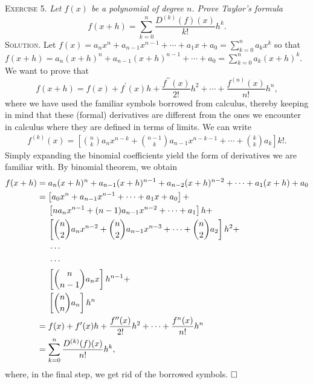 \documentclass[11pt, leqno]{article}
\newcommand{\done}{\ensuremath{\hfill\square}}
\begin{document}
\textsc{Exercise 5}. \emph{Let $f(x)$ be a polynomial of degree $n$. Prove Taylor's formula 
\begin{displaymath}
f(x+h) = \sum_{k=0}^n \frac{D^{(k)}(f)(x)}{k!} h^k.
\end{displaymath}}\textsc{Solution}. Let $f(x) = a_nx^n + a_{n-1}x^{n-1} + \cdots + a_1x + a_0 = \sum_{k=0}^n a_kx^k$ so that $f(x+h) = a_n(x+h)^n + a_{n-1}(x+h)^{n-1} + \cdots + a_0 = \sum_{k=0}^n a_k(x+h)^k$. We want to prove that 
\begin{displaymath}
f(x+h) = f(x) + f^{\prime}(x)h + \frac{f^{\prime\prime}(x)}{2!}h^2 + \cdots + \frac{f^{(n)}(x)}{n!}h^n,
\end{displaymath}
where we have used the familiar symbols borrowed from calculus, thereby keeping in mind that these (formal) derivatives are different from the ones we encounter in calculus where they are defined in terms of limits. We can write 
\begin{align*}
f^{(k)}(x) = \left[\binom{n}{k} a_nx^{n-k} + \binom{n-1}{k}a_{n-1} x^{n-k-1} + \cdots + \binom{k}{k}a_k \right]k!.
\end{align*}
Simply expanding the binomial coefficients yield the form of derivatives we are familiar with. By binomial theorem, we obtain
\begin{align*}
  f(x+h) &= a_n(x+h)^n + a_{n-1}(x+h)^{n-1} + a_{n-2}(x+h)^{n-2} + \cdots + a_1(x+h) + a_0 \\
         &= \left[ a_0x^n + a_{n-1}x^{n-1} + \cdots + a_1x + a_0 \right] + \\
         &\hspace{4.5mm} \left[n a_nx^{n-1} + (n-1)a_{n-1}x^{n-2} + \cdots + a_1 \right] h + \\
         &\hspace{4.5mm} \left[ \binom{n}{2}a_nx^{n-2} + \binom{n}{2} a_{n-1}x^{n-3} + \cdots + \binom{n}{2} a_2  \right] h^2 + \\
         &\hspace{5mm} \cdots \\
         &\hspace{5mm} \cdots \\
         &\hspace{4.5mm} \left[ \binom{n}{n-1}a_nx \right] h^{n-1} + \\
         &\hspace{4.5mm} \left[\binom{n}{n}a_n\right]h^n \\
         &= f(x) + f^{\prime}(x)h + \frac{f^{\prime\prime}(x)}{2!}h^2 + \cdots + \frac{f^n(x)}{n!} h^n \\
  &= \sum_{k=0}^n \frac{D^{(k)}(f)(x)}{n!}h^k,
\end{align*}
where, in the final step, we get rid of the borrowed symbols. \done
\end{document}
